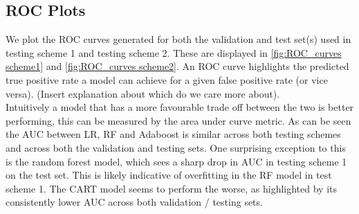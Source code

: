 \documentclass[11pt, letterpaper, journal]{IEEEtran}
\begin{document}
\subsection{ROC Plots}
We plot the ROC curves generated for both the validation and test set(s) used in testing scheme 1 and testing scheme 2. These are displayed in \ref{fig:ROC_curves scheme1} and \ref{fig:ROC_curves scheme2}. An ROC curve highlights the predicted true positive rate a model can achieve for a given false positive rate (or vice versa). (Insert explanation about which do we care more about).
\\ 
Intuitively a model that has a more favourable trade off between the two is better performing, this can be measured by the area under curve metric. As can be seen the AUC between LR, RF and Adaboost is similar across both testing schemes and across both the validation and testing sets. One surprising exception to this is the random forest model, which sees a sharp drop in AUC in testing scheme 1 on the test set. This is likely indicative of overfitting in the RF model in test scheme 1. The CART model seems to perform the worse, as highlighted by its consistently lower AUC across both validation / testing sets.
\end{document}
